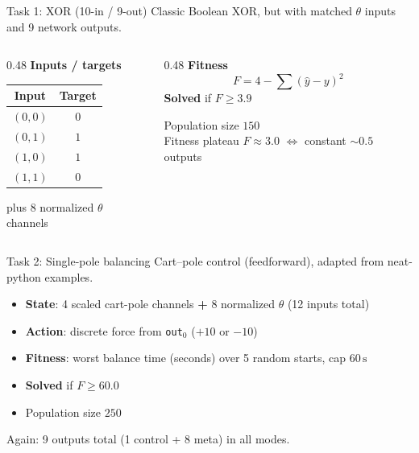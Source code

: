 \documentclass[aspectratio=169,11pt]{beamer}
\begin{document}
\begin{frame}{Task 1: XOR (10-in / 9-out)}
  Classic Boolean XOR, but with matched $\theta$ inputs and 9 network outputs.

  \vspace{0.5em}
  \begin{columns}[t]
    \begin{column}{0.48\textwidth}
      \textbf{Inputs / targets}
      \begin{center}
      \begin{tabular}{cc}
        \toprule
        Input & Target \\
        \midrule
        $(0,0)$ & $0$ \\
        $(0,1)$ & $1$ \\
        $(1,0)$ & $1$ \\
        $(1,1)$ & $0$ \\
        \bottomrule
      \end{tabular}
      \end{center}
      plus 8 normalized $\theta$ channels
    \end{column}
    \begin{column}{0.48\textwidth}
      \textbf{Fitness}
      \[
        F = 4 - \sum (\hat y - y)^2
      \]
      \textbf{Solved} if $F \ge 3.9$

      \vspace{0.6em}
      Population size $150$\\
      Fitness plateau $F\approx 3.0$
      $\Leftrightarrow$ constant $\sim 0.5$ outputs
    \end{column}
  \end{columns}
\end{frame}

\begin{frame}{Task 2: Single-pole balancing}
  Cart--pole control (feedforward), adapted from neat-python examples.

  \vspace{0.5em}
  \begin{itemize}
    \item \textbf{State}: 4 scaled cart-pole channels \textbf{+} 8 normalized $\theta$
      (12 inputs total)
    \item \textbf{Action}: discrete force from \texttt{out}$_0$ ($+10$ or $-10$)
    \item \textbf{Fitness}: worst balance time (seconds) over 5 random starts, cap $60\,\mathrm{s}$
    \item \textbf{Solved} if $F \ge 60.0$
    \item Population size $250$
  \end{itemize}

  \vspace{0.5em}
  Again: 9 outputs total (1 control + 8 meta) in all modes.
\end{frame}
\end{document}
